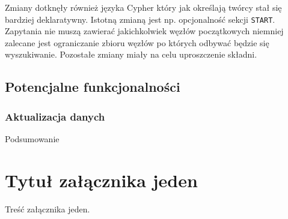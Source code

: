 \documentclass[brudnopis]{xmgr}
\begin{document}
Zmiany dotknęły również języka Cypher który jak określają twórcy stał się bardziej deklaratywny. Istotną zmianą jest np. opcjonalność sekcji \texttt{START}. Zapytania nie muszą zawierać jakichkolwiek węzłów początkowych niemniej zalecane jest ograniczanie zbioru węzłów po których odbywać będzie się wyszukiwanie. Pozostałe zmiany miały na celu uproszczenie składni.

\section{Potencjalne funkcjonalności}

\subsection{Aktualizacja danych}

\summary
Podsumowanie

\appendix
\chapter{Tytuł załącznika jeden}

Treść załącznika jeden.




\listoftables

\listoffigures

\oswiadczenie
\end{document}
